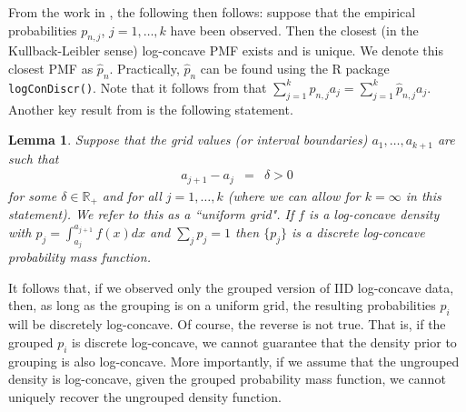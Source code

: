 \documentclass[12pt]{article} %
\newtheorem{lemma}[theorem]{Lemma}
\newcommand{\RR}{\mathbb {R}}
\begin{document}
From the work in \citet{JankowskiDiscr2013}, the following then follows:  suppose that the empirical probabilities $p_{n,j}$, $j=1, \ldots, k$ have been observed.   Then the closest (in the Kullback-Leibler sense) log-concave PMF exists and is unique.   We denote this closest PMF as $\widehat{p}_n$.   Practically, $\widehat p_n$ can be found using the R package \texttt{logConDiscr()}.  Note that it follows from \citet{JankowskiDiscr2013} that $\sum_{j=1}^k p_{n,j} a_j=\sum_{j=1}^k \widehat p_{n,j} a_j.$  Another key result from \citet{JankowskiDiscr2013}  is the following statement. 

\begin{lemma}
Suppose that the grid values (or interval boundaries) $a_1, \ldots, a_{k+1}$ are such that
\begin{eqnarray*}
a_{j+1}-a_j &=& \delta >0
\end{eqnarray*}
for some $\delta \in \RR_+$ and for all $j=1, \ldots, k$ (where we can allow for $k=\infty$ in this statement).   We refer to this as a ``uniform grid". If $f$ is a log-concave density with
$p_j=\int_{a_j}^{a_{j+1}}f(x)dx$  and $\sum_j p_j = 1$ then $\{p_j\}$ is a discrete log-concave probability mass function.
\end{lemma}
It follows that, if we observed only the grouped version of IID log-concave data, then, as long as the grouping is on a uniform grid, the resulting probabilities $p_i$ will be discretely log-concave.   Of course, the reverse is not true.   That is, if the grouped $p_i$ is discrete log-concave, we cannot guarantee that the density prior to grouping is also log-concave.   More importantly, if we assume that the ungrouped density is log-concave, given the grouped probability mass function, we cannot uniquely recover the ungrouped density function. 

\end{document}

